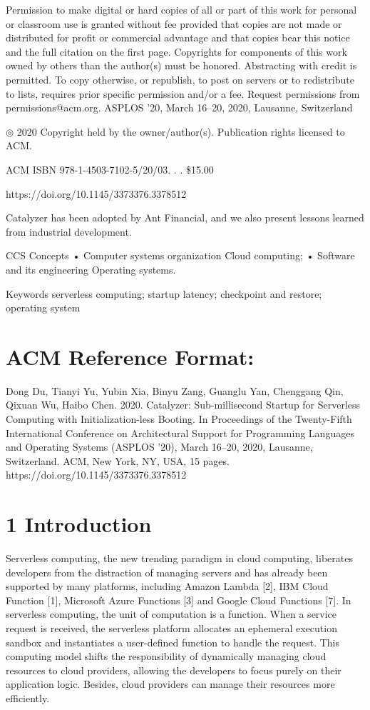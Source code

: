 \documentclass[
  10
]{article}
\begin{document}
Permission to make digital or hard copies of all or part of this work
for personal or classroom use is granted without fee provided that
copies are not made or distributed for profit or commercial advantage
and that copies bear this notice and the full citation on the first
page. Copyrights for components of this work owned by others than the
author(s) must be honored. Abstracting with credit is permitted. To copy
otherwise, or republish, to post on servers or to redistribute to lists,
requires prior specific permission and/or a fee. Request permissions
from permissions@acm.org. ASPLOS '20, March 16--20, 2020, Lausanne,
Switzerland

\(\circledcirc\) 2020 Copyright held by the owner/author(s). Publication
rights licensed to ACM.

ACM ISBN 978-1-4503-7102-5/20/03. . . \$15.00

https://doi.org/10.1145/3373376.3378512

Catalyzer has been adopted by Ant Financial, and we also present lessons
learned from industrial development.

CCS Concepts • Computer systems organization Cloud computing; • Software
and its engineering Operating systems.

Keywords serverless computing; startup latency; checkpoint and restore;
operating system

\section{ACM Reference Format:}\label{acm-reference-format}

Dong Du, Tianyi Yu, Yubin Xia, Binyu Zang, Guanglu Yan, Chenggang Qin,
Qixuan Wu, Haibo Chen. 2020. Catalyzer: Sub-millisecond Startup for
Serverless Computing with Initialization-less Booting. In Proceedings of
the Twenty-Fifth International Conference on Architectural Support for
Programming Languages and Operating Systems (ASPLOS '20), March 16--20,
2020, Lausanne, Switzerland. ACM, New York, NY, USA, 15 pages.
https://doi.org/10.1145/3373376.3378512

\section{1 Introduction}\label{introduction}

Serverless computing, the new trending paradigm in cloud computing,
liberates developers from the distraction of managing servers and has
already been supported by many platforms, including Amazon Lambda
{[}2{]}, IBM Cloud Function {[}1{]}, Microsoft Azure Functions {[}3{]}
and Google Cloud Functions {[}7{]}. In serverless computing, the unit of
computation is a function. When a service request is received, the
serverless platform allocates an ephemeral execution sandbox and
instantiates a user-defined function to handle the request. This
computing model shifts the responsibility of dynamically managing cloud
resources to cloud providers, allowing the developers to focus purely on
their application logic. Besides, cloud providers can manage their
resources more efficiently.
\end{document}
